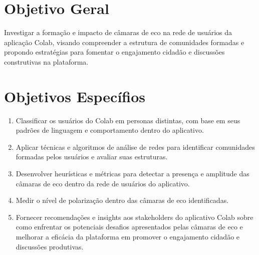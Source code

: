 \section{Objetivo Geral}

Investigar a formação e impacto de câmaras de eco na rede de usuários da aplicação Colab, visando compreender a estrutura de comunidades formadas e propondo estratégias para fomentar o engajamento cidadão e discussões construtivas na plataforma.

\section{Objetivos Específios}

\begin{enumerate}
    \item Classificar os usuários do Colab em personas distintas, com base em seus padrões de linguagem e comportamento dentro do aplicativo.
    \item Aplicar técnicas e algoritmos de análise de redes para identificar comunidades formadas pelos usuários e avaliar suas estruturas.
    \item Desenvolver heurísticas e métricas para detectar a presença e amplitude das câmaras de eco dentro da rede de usuários do aplicativo.
    \item Medir o nível de polarização dentro das câmaras de eco identificadas.
    \item Fornecer recomendações e insights aos stakeholders do aplicativo Colab sobre como enfrentar os potenciais desafios apresentados pelas câmaras de eco e melhorar a eficácia da plataforma em promover o engajamento cidadão e discussões produtivas.
  \end{enumerate}